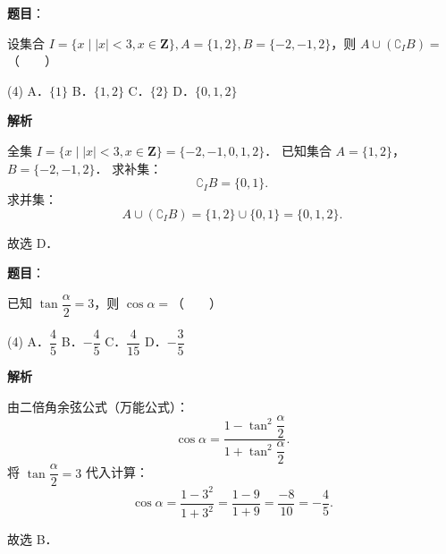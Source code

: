
\begin{answer}

\textbf{题目}：

设集合 $I = \{x \mid |x| < 3, x \in \mathbf{Z}\}, A = \{1, 2\}, B = \{-2, -1, 2\}$，则 $A \cup (\complement_I B) =$\mbox{（　　）}

\begin{gkopts}(4)
\task A．$\{1\}$
\task B．$\{1, 2\}$
\task C．$\{2\}$
\task D．$\{0, 1, 2\}$
\end{gkopts}

\textbf{解析}

全集 $I = \{x \mid |x| < 3, x \in \mathbf{Z}\} = \{-2, -1, 0, 1, 2\}$．
已知集合 $A = \{1, 2\}$，$B = \{-2, -1, 2\}$．
求补集：
\nopagebreak[4]
\[
\complement_I B = \{0, 1\}.
\]
求并集：
\nopagebreak[4]
\[
A \cup (\complement_I B) = \{1, 2\} \cup \{0, 1\} = \{0, 1, 2\}.
\]

故选 D．


\end{answer}
\begin{answer}

\textbf{题目}：

已知 $\tan\dfrac{\alpha}{2} = 3$，则 $\cos\alpha =$\mbox{（　　）}

\begin{gkopts}(4)
\task A．$\dfrac{4}{5}$
\task B．$-\dfrac{4}{5}$
\task C．$\dfrac{4}{15}$
\task D．$-\dfrac{3}{5}$
\end{gkopts}

\textbf{解析}

由二倍角余弦公式（万能公式）：
\nopagebreak[4]
\[
\cos\alpha = \dfrac{1 - \tan^2\dfrac{\alpha}{2}}{1 + \tan^2\dfrac{\alpha}{2}}.
\]
将 $\tan\dfrac{\alpha}{2} = 3$ 代入计算：
\nopagebreak[4]
\[
\cos\alpha = \dfrac{1 - 3^2}{1 + 3^2} = \dfrac{1 - 9}{1 + 9} = \dfrac{-8}{10} = -\dfrac{4}{5}.
\]

故选 B．


\end{answer}
